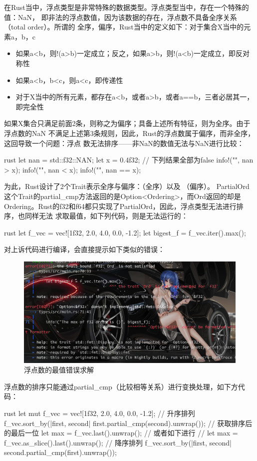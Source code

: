 在Rust当中，浮点类型是非常特殊的数据类型。浮点类型当中，存在一个特殊的值：NaN，
即非法的浮点数值，因为该数据的存在，浮点数不具备全序关系（total order）。所谓的
全序，偏序，Rust当中的定义如下：对于集合X当中的元素a，b，c
\begin{itemize}
  \item 如果a<b，则!(a>b)一定成立；反之，如果a>b，则!(a<b)一定成立，即反对称性
  \item 如果a<b，b<c，则a<c，即传递性
  \item 对于X当中的所有元素，都存在a<b，或者a>b，或者a==b，三者必居其一，即完全性
\end{itemize}
如果X集合只满足前面2条，则称之为偏序；具备上述所有特征，则为全序。由于浮点数的NaN
不满足上述第3条规则，因此，Rust的浮点数属于偏序，而非全序，这回导致一个问题：浮点
数无法排序——非NaN的数值无法与NaN进行比较：
\begin{code-block}{rust}
let nan = std::f32::NAN;
let x = 0.4f32;
// 下列结果全部为false
info!("{}", nan > x);
info!("{}", nan < x);
info!("{}", nan == x);
\end{code-block}
为此，Rust设计了2个Trait表示全序与偏序：（全序）以及
（偏序）。
PartialOrd这个Trait的partial\_cmp方法返回的是Option<Ordering>，而Ord返回的却是
Ordering。Rust的f32和f64都只实现了PartialOrd，因此，浮点类型无法进行排序，也同样无法
求取最值，如下列代码，则是无法运行的：
\begin{code-block}{rust}
let f_vec = vec![1f32, 2.0, 4.0, 0.0, -1.2];
let bigest_f = f_vec.iter().max();
\end{code-block}
对上诉代码进行编译，会直接提示如下类似的错误：
\begin{figure}[H]
  \centering
  \includegraphics[scale=0.2]{rust_float_cmp_error.png}
  \caption{浮点数的最值错误求解}
  \label{fig:rust_float_cmp_error}
\end{figure}
浮点数的排序只能通过partial\_cmp（比较相等关系）进行变换处理，如下方代码：
\label{float_sort}
\begin{code-block}{rust}
let mut f_vec = vec![1f32, 2.0, 4.0, 0.0, -1.2];
// 升序排列
f_vec.sort_by(|first, second| first.partial_cmp(second).unwrap());
// 获取排序后的最后一位
let max = f_vec.last().unwrap();
// 或者如下进行
// let max = f_vec.as_slice().last().unwrap();
// 降序排列
f_vec.sort_by(|first, second| second.partial_cmp(first).unwrap());
\end{code-block}

